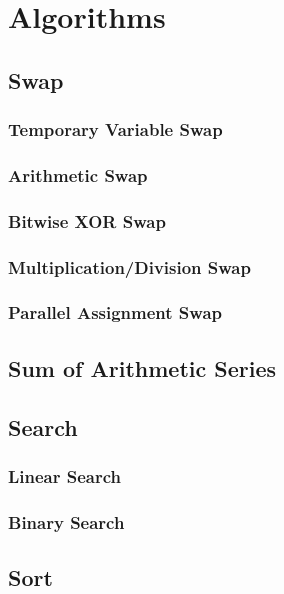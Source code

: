 \chapter{Algorithms}%
\section{Swap}
\subsection{Temporary Variable Swap}

\subsection{Arithmetic Swap}

\subsection{Bitwise XOR Swap}

\subsection{Multiplication/Division Swap}

\subsection{Parallel Assignment Swap}

\section{Sum of Arithmetic Series}

\section{Search}

\subsection{Linear Search}

\subsection{Binary Search}

\section{Sort}

